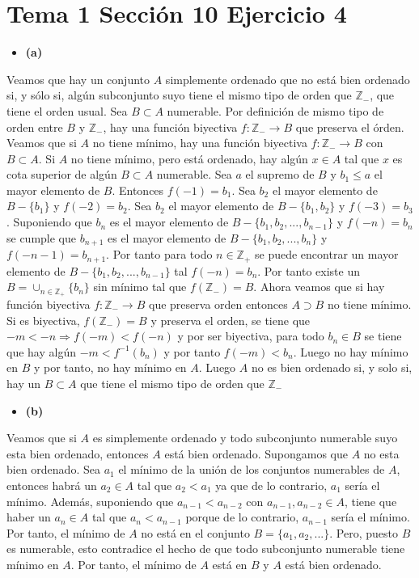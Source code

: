 \documentclass{article}
\begin{document}
\section{Tema 1 Sección 10 Ejercicio 4}
\begin{itemize}
\item \bf (a) \rm
\end{itemize}
Veamos que hay un conjunto $A$ simplemente ordenado que no está bien ordenado si, y sólo si, algún subconjunto suyo tiene el mismo tipo de orden que $\mathbb{Z}_{-}$, que tiene el orden usual. Sea $B\subset A$ numerable. Por definición de mismo tipo de orden entre $B$ y $\mathbb{Z}_{-}$, hay una función biyectiva $f:\mathbb{Z}_{-}\rightarrow B$ que preserva el órden. Veamos que si $A$ no tiene mínimo, hay una función biyectiva $f:\mathbb{Z}_{-}\rightarrow B$ con $B\subset A$. Si $A$ no tiene mínimo, pero está ordenado, hay algún $x\in A$ tal que $x$ es cota superior de algún $B\subset A$ numerable. Sea $a$ el supremo de $B$ y $b_1\leq a$ el mayor elemento de $B$. Entonces $f(-1)= b_1$. Sea $b_2$ el mayor elemento de $B-\{b_1\}$ y $f(-2)= b_2$. Sea $b_2$ el mayor elemento de $B-\{b_1,b_2\}$ y $f(-3)= b_3$. Suponiendo que $b_n$ es el mayor elemento de $B-\{b_1,b_2,...,b_{n-1}\}$ y $f(-n)= b_n$ se cumple que $b_{n+1}$ es el mayor elemento de $B-\{b_1,b_2,...,b_{n}\}$ y $f(-n-1)= b_{n+1}$. Por tanto para todo $n\in \mathbb{Z}_{+}$ se puede encontrar un mayor elemento de  $B-\{b_1,b_2,...,b_{n-1}\}$ tal $f(-n)= b_{n}$. Por tanto existe un $B=\cup_{n\in \mathbb{Z}_{+}}\{b_n\}$ sin mínimo tal que $f(\mathbb{Z}_{-})=B$. Ahora veamos que si hay función biyectiva $f:\mathbb{Z}_{-}\rightarrow B$ que preserva orden entonces $A\supset B$ no tiene mínimo. Si es biyectiva, $f(\mathbb{Z}_{-})=B$ y preserva el orden, se tiene que $-m<-n\Rightarrow f(-m)<f(-n)$ y por ser biyectiva, para todo $b_n\in B$ se tiene que hay algún $-m<f^{-1}(b_n)$ y por tanto $f(-m)<b_n$. Luego no hay mínimo en $B$ y por tanto, no hay mínimo en $A$. Luego $A$ no es bien ordenado si, y solo si, hay un $B\subset A$ que tiene el mismo tipo de orden que $\mathbb{Z}_{-}$
\begin{itemize}
\item \bf (b) \rm
\end{itemize}
Veamos que si $A$ es simplemente ordenado y todo subconjunto numerable suyo esta bien ordenado, entonces $A$ está bien ordenado. Supongamos que $A$ no esta bien ordenado. Sea $a_1$ el mínimo de la unión de los conjuntos numerables de $A$, entonces habrá un $a_2\in A$ tal que $a_2<a_1$ ya que de lo contrario, $a_1$ sería el mínimo. Además, suponiendo que $a_{n-1}<a_{n-2}$ con $a_{n-1},a_{n-2}\in A$, tiene que haber un $a_n\in A$ tal que $a_{n}<a_{n-1}$ porque de lo contrario, $a_{n-1}$ sería el mínimo. Por tanto, el mínimo de $A$ no está en el conjunto $B=\{a_1,a_2,...\}$. Pero, puesto $B$ es numerable, esto contradice el hecho de que todo subconjunto numerable tiene mínimo en $A$. Por tanto, el mínimo de $A$ está en $B$ y $A$ está bien ordenado.
\end{document}
